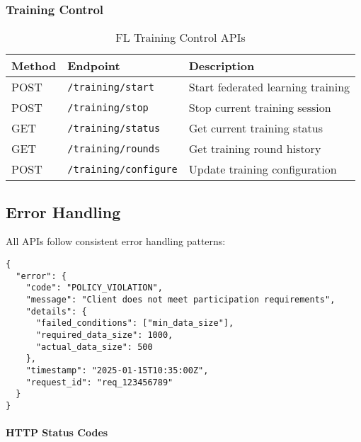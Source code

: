 \subsubsection{Training Control}

\begin{table}[H]
\centering
\caption{FL Training Control APIs}
\label{tab:fl-training-api}
\begin{tabularx}{\textwidth}{@{}llX@{}}
\toprule
\textbf{Method} & \textbf{Endpoint} & \textbf{Description} \\
\midrule
POST & \texttt{/training/start} & Start federated learning training \\
POST & \texttt{/training/stop} & Stop current training session \\
GET & \texttt{/training/status} & Get current training status \\
GET & \texttt{/training/rounds} & Get training round history \\
POST & \texttt{/training/configure} & Update training configuration \\
\bottomrule
\end{tabularx}
\end{table}

\subsection{Error Handling}

All APIs follow consistent error handling patterns:

\begin{lstlisting}[style=jsoncode, caption=Standard Error Response Format]
{
  "error": {
    "code": "POLICY_VIOLATION",
    "message": "Client does not meet participation requirements",
    "details": {
      "failed_conditions": ["min_data_size"],
      "required_data_size": 1000,
      "actual_data_size": 500
    },
    "timestamp": "2025-01-15T10:35:00Z",
    "request_id": "req_123456789"
  }
}
\end{lstlisting}

\paragraph{HTTP Status Codes}

